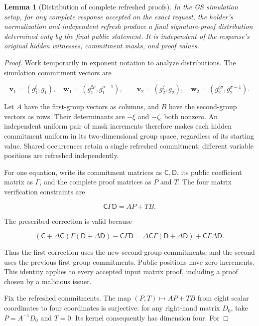 \documentclass[11pt]{article}
\newtheorem{lemma}{Lemma}
\begin{document}
\begin{lemma}[Distribution of complete refreshed proofs]
In the GS simulation setup, for any complete response accepted on the exact request, the holder's normalization and independent refresh produce a final signature-proof distribution determined only by the final public statement. It is independent of the response's original hidden witnesses, commitment masks, and proof values.

\end{lemma}
\begin{proof}
Work temporarily in exponent notation to analyze distributions. The simulation commitment vectors are

\[
\boldsymbol v_1=(g_1^\xi,g_1),\quad
\boldsymbol w_1=(g_1^{\xi\rho},g_1^{\rho-1}),\qquad
\boldsymbol v_2=(g_2^\zeta,g_2),\quad
\boldsymbol w_2=(g_2^{\zeta\sigma},g_2^{\sigma-1}).
\tag{7}
\]

Let \(A\) have the first-group vectors as columns, and \(B\) have the second-group vectors as rows. Their determinants are \(-\xi\) and \(-\zeta\), both nonzero. An independent uniform pair of mask increments therefore makes each hidden commitment uniform in its two-dimensional group space, regardless of its starting value. Shared occurrences retain a single refreshed commitment; different variable positions are refreshed independently.

For one equation, write its commitment matrices as \(\mathsf C,\mathsf D\), its public coefficient matrix as \(\Gamma\), and the complete proof matrices as \(P\) and \(T\). The four matrix verification constraints are

\[
\mathsf C\Gamma\mathsf D=AP+TB.
\tag{8}
\]

The prescribed correction is valid because

\[
(\mathsf C+\Delta\mathsf C)\Gamma(\mathsf D+\Delta\mathsf D)
-\mathsf C\Gamma\mathsf D
=\Delta\mathsf C\Gamma(\mathsf D+\Delta\mathsf D)
+\mathsf C\Gamma\Delta\mathsf D.
\tag{9}
\]

Thus the first correction uses the new second-group commitments, and the second uses the previous first-group commitments. Public positions have zero increments. This identity applies to every accepted input matrix proof, including a proof chosen by a malicious issuer.

Fix the refreshed commitments. The map \((P,T)\mapsto AP+TB\) from eight scalar coordinates to four coordinates is surjective: for any right-hand matrix \(D_0\), take \(P=A^{-1}D_0\) and \(T=0\). Its kernel consequently has dimension four. For


\end{proof}
\end{document}
